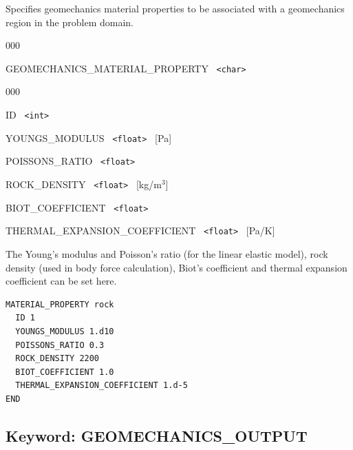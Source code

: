 \hfill\hyperlink{target_key}{\return}

 Specifies geomechanics material properties to be associated with a geomechanics region in the problem domain.

\begin{deflist}{000}
\item[GEOMECHANICS\_MATERIAL\_PROPERTY] \ {\tt <char>}
\begin{deflist}{000}
\item[ID] \ {\tt <int>}
\item[YOUNGS\_MODULUS] \ {\tt <float>} \ [Pa]
\item[POISSONS\_RATIO] \ {\tt <float>}
\item[ROCK\_DENSITY] \ {\tt <float>} \ [kg/m$^3$]
\item[BIOT\_COEFFICIENT] \ {\tt <float>} 
\item[THERMAL\_EXPANSION\_COEFFICIENT] \ {\tt <float>} \ [Pa/K]
\end{deflist}
\item[\keyend]
\end{deflist}

 The Young's modulus and Poisson's ratio (for the linear elastic model), rock density (used in body force calculation), Biot's coefficient and thermal expansion coefficient can be set here.

\begin{mdframed}


\footnotesize

\begin{verbatim}
MATERIAL_PROPERTY rock	 
  ID 1
  YOUNGS_MODULUS 1.d10
  POISSONS_RATIO 0.3
  ROCK_DENSITY 2200
  BIOT_COEFFICIENT 1.0
  THERMAL_EXPANSION_COEFFICIENT 1.d-5
END
\end{verbatim}
\normalsize
\end{mdframed}

\hyperlink{target_key}{\return}



\newpage
\protect\hypertarget{target_geomech_output}{}
 
\subsection{Keyword: GEOMECHANICS\_OUTPUT}

\hfill\hyperlink{target_key}{\return}

